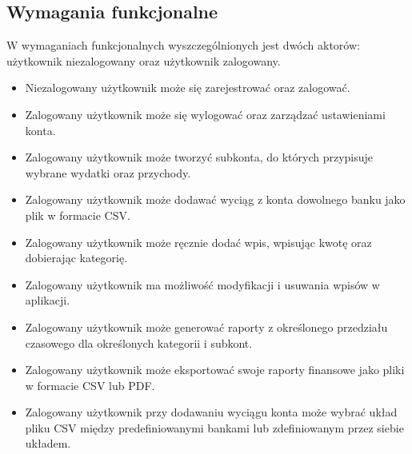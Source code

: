 \documentclass{article}
\begin{document}
	\subsection{Wymagania funkcjonalne}
	W wymaganiach funkcjonalnych wyszczególnionych jest dwóch aktorów: użytkownik niezalogowany oraz użytkownik zalogowany.
	\begin{itemize}
		\item Niezalogowany użytkownik może się zarejestrować oraz zalogować.
		\item Zalogowany użytkownik może się wylogować oraz zarządzać ustawieniami konta.
		\item Zalogowany użytkownik może tworzyć subkonta, do których przypisuje wybrane wydatki oraz przychody.
		\item Zalogowany użytkownik może dodawać wyciąg z konta dowolnego banku jako plik w formacie CSV.
		\item Zalogowany użytkownik może ręcznie dodać wpis, wpisując kwotę oraz dobierając kategorię.
		\item Zalogowany użytkownik ma możliwość modyfikacji i usuwania wpisów w aplikacji.
		\item Zalogowany użytkownik może generować raporty z określonego przedziału czasowego dla określonych kategorii i subkont.
		\item Zalogowany użytkownik może eksportować swoje raporty finansowe jako pliki w formacie CSV lub PDF.
		\item Zalogowany użytkownik przy dodawaniu wyciągu konta może wybrać układ pliku CSV między predefiniowanymi bankami lub zdefiniowanym przez siebie układem.
		
	\end{itemize}
\end{document}
